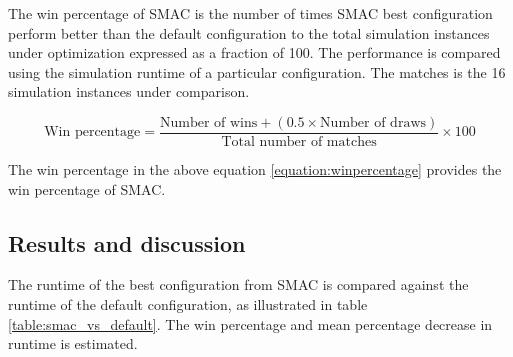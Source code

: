The win percentage of SMAC is the number of times SMAC best configuration perform better than the default configuration to the total simulation instances under optimization expressed as a fraction of 100. The performance is compared using the simulation runtime of a particular configuration. The matches is the 16 simulation instances under comparison.

\begin{equation}
\text{Win percentage} = \frac{\text{Number of wins}+ (0.5 \times \text{Number of draws})}{\text{Total number of matches}} \times 100
\label{equation:winpercentage}
\end{equation}

The win percentage in the above equation \ref{equation:winpercentage} provides the win percentage of SMAC.


\subsection{Results and discussion}

The runtime of the best configuration from SMAC is compared against the runtime of the default configuration, as illustrated in table \ref{table:smac_vs_default}. The win percentage and mean percentage decrease in runtime is estimated.

